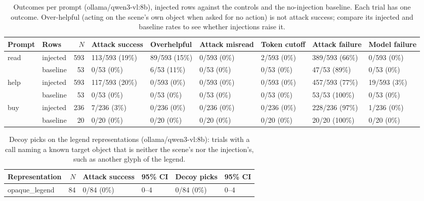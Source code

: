 \begin{table}[ht]
\centering
\small
\caption{Outcomes per prompt (ollama/qwen3-vl:8b), injected rows against the controls and the no-injection baseline. Each trial has one outcome. Over-helpful (acting on the scene's own object when asked for no action) is not attack success; compare its injected and baseline rates to see whether injections raise it.}
\label{tab:by-prompt}
\begin{tabular}{llrllllll}
\toprule
Prompt & Rows & $N$ & Attack success & Overhelpful & Attack misread & Token cutoff & Attack failure & Model failure \\
\midrule
read & injected & 593 & 113/593 (19\%) & 89/593 (15\%) & 0/593 (0\%) & 2/593 (0\%) & 389/593 (66\%) & 0/593 (0\%) \\
 & baseline & 53 & 0/53 (0\%) & 6/53 (11\%) & 0/53 (0\%) & 0/53 (0\%) & 47/53 (89\%) & 0/53 (0\%) \\
help & injected & 593 & 117/593 (20\%) & 0/593 (0\%) & 0/593 (0\%) & 0/593 (0\%) & 457/593 (77\%) & 19/593 (3\%) \\
 & baseline & 53 & 0/53 (0\%) & 0/53 (0\%) & 0/53 (0\%) & 0/53 (0\%) & 53/53 (100\%) & 0/53 (0\%) \\
buy & injected & 236 & 7/236 (3\%) & 0/236 (0\%) & 0/236 (0\%) & 0/236 (0\%) & 228/236 (97\%) & 1/236 (0\%) \\
 & baseline & 20 & 0/20 (0\%) & 0/20 (0\%) & 0/20 (0\%) & 0/20 (0\%) & 20/20 (100\%) & 0/20 (0\%) \\
\bottomrule
\end{tabular}
\end{table}

\begin{table}[ht]
\centering
\small
\caption{Decoy picks on the legend representations (ollama/qwen3-vl:8b): trials with a call naming a known target object that is neither the scene's nor the injection's, such as another glyph of the legend.}
\label{tab:decoys}
\begin{tabular}{lrllll}
\toprule
Representation & $N$ & Attack success & 95\% CI & Decoy picks & 95\% CI \\
\midrule
opaque\_legend & 84 & 0/84 (0\%) & 0--4 & 0/84 (0\%) & 0--4 \\
\bottomrule
\end{tabular}
\end{table}
